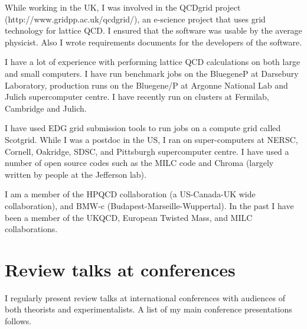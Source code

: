 \documentclass[12pt]{article}
\begin{document}
While working in the UK, I was involved in the 
QCDgrid project (http://www.gridpp.ac.uk/qcdgrid/), 
an e-science project that
uses grid technology for lattice QCD.  I ensured that the software was
usable by the average physicist. Also I wrote requirements
documents for the developers of the software.

I have a lot of experience with performing lattice QCD calculations on
both large and small computers. 
I have run benchmark jobs on the 
BluegeneP at Darsebury Laboratory, production runs on
the Bluegene/P at Argonne National Lab and Julich supercomputer centre.
I have recently run on 
clusters at Fermilab, Cambridge and Julich.

I have
used EDG grid submission tools to run jobs on a compute grid
called Scotgrid.  While I was a postdoc in the US, I ran on
super-computers at NERSC, Cornell, Oakridge, SDSC, and Pittsburgh
supercomputer centre. I have used a number of open source codes such
as the MILC code and Chroma (largely written by people at the
Jefferson lab).

I am a member of the
HPQCD collaboration (a US-Canada-UK wide collaboration),
and BMW-c (Budapest-Marseille-Wuppertal).
In the past I have been a member of the UKQCD,
European Twisted Mass,
and MILC collaborations.

\section{Review talks at conferences}

I regularly present review talks at international
conferences with audiences of both theorists and experimentalists.
A list of my main conference presentations follows.
\end{document}
